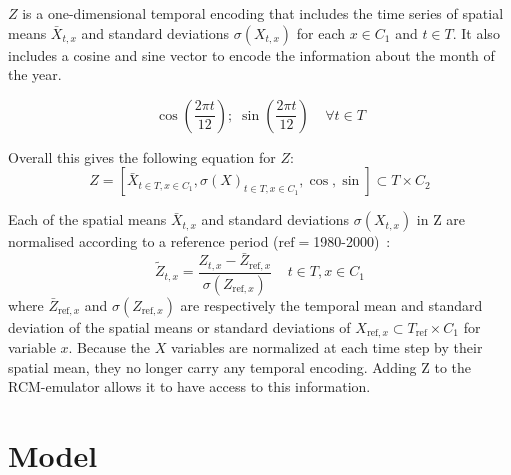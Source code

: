 \documentclass[a4paper,11pt,oneside]{report}
\begin{document}
$Z$ is a one-dimensional temporal encoding that includes the time series of spatial means $\bar{X}_{t,x}$ and standard deviations $\sigma(X_{t,x})$ for each $x\in C_1$ and $t\in T$. It also includes a cosine and sine vector to encode the information about the month of the year. 

\begin{equation}
       \cos\left(\frac{2\pi t}{12}\right);\; \sin\left(\frac{2\pi t}{12}\right) \;\;\;\; \forall t\in T
\end{equation}

Overall this gives the following equation for $Z$:
\begin{equation}\label{eq:Z}
    Z = \left[ \bar{X}_{t\in T, x\in C_1}, \sigma\left(X\right)_{t\in T, x\in C_1}, \cos, \sin \right] \subset T \times C_2
\end{equation}

Each of the spatial means $\bar{X}_{t,x}$ and standard deviations $\sigma(X_{t,x})$ in Z are normalised according to a reference period ($\mathrm{ref}=$1980-2000)~\cite{Doury}:
\begin{equation}\label{eq:normalisation-Z}
    \tilde{Z}_{t,x} = \frac{Z_{t,x}-\bar{Z}_{\mathrm{\mathrm{ref}},x}}{\sigma(Z_{\mathrm{ref},x})} \;\;\;\; t\in T, x\in C_1
\end{equation}
where $\bar{Z}_{\mathrm{ref},x}$ and $\sigma(Z_{\mathrm{ref},x})$ are respectively the temporal mean and standard deviation of the spatial means or standard deviations of $X_{\mathrm{ref}, x} \subset T_{\mathrm{ref}}\times C_1$ for variable $x$. Because the $X$ variables are normalized at each time step by their spatial mean, they no longer carry any temporal encoding. Adding Z to the RCM-emulator allows it to have access to this information. 



\section{Model}\label{sec:model}
\end{document}
